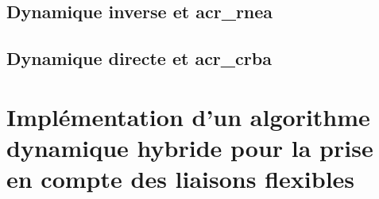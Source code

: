 \documentclass{report}
\begin{document}
\section{Dynamique inverse et \gls{acr_rnea}}

\section{Dynamique directe et \gls{acr_crba}}



\chapter{Implémentation d'un algorithme dynamique hybride pour la prise en compte des liaisons flexibles}

\end{document}
